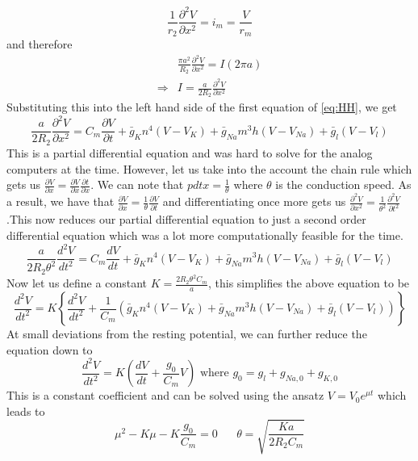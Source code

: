 \documentclass{article}
\newcommand{\pd}[2]{\frac{\partial #1}{\partial #2}}
\newcommand{\od}[2]{\frac{d #1}{d #2}}
\newcommand{\pdt}[2]{\frac{\partial ^2 #1}{\partial #2 ^2}}
\newcommand{\odt}[2]{\frac{d^2 #1}{d #2 ^2}}
\numberwithin{equation}{section}
\begin{document}
\begin{equation}
    \frac{1}{r_2}\pdt{V}{x} = i_m = \frac{V}{r_m}
\end{equation}
and therefore
\begin{equation}
\begin{split}
    &\frac{\pi a^2}{R_2}\pdt{V}{x} =I(2\pi a) \\
    \Rightarrow &I= \frac{a}{2R_2}\pdt{V}{x}
\end{split}
\end{equation}
Substituting this into the left hand side of the first equation of \eqref{eq:HH}, we get 
\begin{equation}
    \frac{a}{2R_2} \pdt{V}{x} = C_m\pd{V}{t} +\bar{g}_Kn^4(V-V_K) +\bar{g}_{Na}m^3h(V-V_{Na})+\bar{g}_l(V-V_l) 
\end{equation}
This is a partial differential equation and was hard to solve for the analog computers at the time. However, let us take into the account the chain rule which gets us $\pd{V}{x} = \pd{V}{x} \pd{t}{x}$. We can note that $pd{t}{x} = \frac{1}{\theta}$ where $\theta$ is the conduction speed. As a result, we have that $\pd{V}{x} = \frac{1}{\theta} \pd{V}{t}$ and differentiating once more gets us $\pdt{V}{x} = \frac{1}{\theta^2}\pdt{V}{t}$.This now reduces our partial differential equation to just a second order differential equation which was a lot more computationally feasible for the time. 
\begin{equation}
    \frac{a}{2R_2 \theta^2} \odt{V}{t} = C_m \od{V}{t} +\bar{g}_Kn^4(V-V_K) +\bar{g}_{Na}m^3h(V-V_{Na})+\bar{g}_l(V-V_l) 
\end{equation}
Now let us define a constant $K = \frac{2R_2 \theta^2 C_m}{a}$, this simplifies the above equation to be 
\begin{equation}
    \odt{V}{t} = K\left\{\odt{V}{t} +\frac{1}{C_m} \left( \bar{g}_Kn^4(V-V_K) +\bar{g}_{Na}m^3h(V-V_{Na})+\bar{g}_l(V-V_l) \right) \right\}
\end{equation}
At small deviations from the resting potential, we can further reduce the equation down to 
\begin{equation}
    \odt{V}{t} = K\left( \od{V}{t} + \frac{g_0}{C_m}V \right) \text{ where } g_0 = g_l + g_{Na,0} + g_{K,0}
\end{equation}
This is a constant coefficient and can be solved using the ansatz $V= V_0 e^{\mu t}$ which leads to
\begin{equation}
    \mu ^2 - K\mu - K\frac{g_0}{C_m} = 0 \hspace{20pt} \theta = \sqrt{\frac{Ka}{2R_2 C_m}}
\end{equation}
\end{document}
